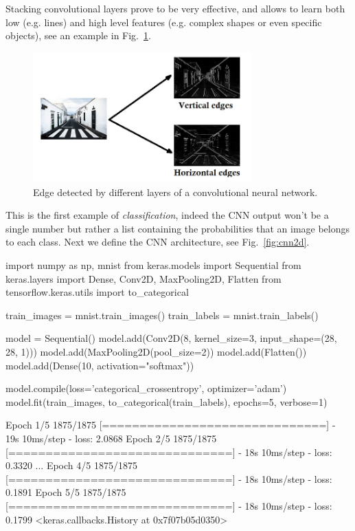 Stacking convolutional layers prove to be very effective, and allows to learn both low (e.g. lines) and high level features (e.g. complex shapes or even specific objects), see an example in Fig.~\ref{fig:conv_filters}.

\begin{figure}[!hbt]
\centering
\includegraphics[width=0.75\textwidth]{figures/edges.jpg}
\caption{Edge detected by different layers of a convolutional neural network.}
\label{fig:conv_filters}
\end{figure}

This is the first example of \emph{classification}, indeed the CNN output won't be a single number but rather a list containing the probabilities that an image belongs to each class. Next we define the CNN architecture, see Fig.~\ref{fig:cnn2d}.

\begin{ipython}
import numpy as np, mnist
from keras.models import Sequential
from keras.layers import Dense, Conv2D, MaxPooling2D, Flatten
from tensorflow.keras.utils import to_categorical

train_images = mnist.train_images() 
train_labels = mnist.train_labels() 

model = Sequential()
model.add(Conv2D(8, kernel_size=3, input_shape=(28, 28, 1)))
model.add(MaxPooling2D(pool_size=2))
model.add(Flatten())
model.add(Dense(10, activation="softmax"))

model.compile(loss='categorical_crossentropy', optimizer='adam')
model.fit(train_images, to_categorical(train_labels), epochs=5, verbose=1)
\end{ipython}
\begin{ioutput}
Epoch 1/5
1875/1875 [==============================] - 19s 10ms/step - loss: 2.0868
Epoch 2/5
1875/1875 [==============================] - 18s 10ms/step - loss: 0.3320
...
Epoch 4/5
1875/1875 [==============================] - 18s 10ms/step - loss: 0.1891
Epoch 5/5
1875/1875 [==============================] - 18s 10ms/step - loss: 0.1799
<keras.callbacks.History at 0x7f07b05d0350>
\end{ioutput}

